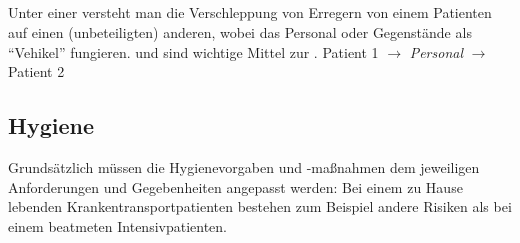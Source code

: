 \subsection{}
\label{topic:kreuzinfektion}

\TextSlide{\TxBeschreibung}
{%
Unter einer  versteht man die
Verschleppung von Erregern von einem Patienten auf einen
(unbeteiligten) anderen, wobei das Personal oder Gegenstände
als \enquote{Vehikel} fungieren. 
und  sind wichtige
Mittel zur .
}{
Patient 1 ${\rightarrow}$ \emph{Personal} ${\rightarrow}$
Patient 2 }{}{}{}

\begin{Synopsis}
\end{Synopsis}

\subsection{ Hygiene}

Grundsätzlich müssen die Hygienevorgaben und -maßnahmen dem
jeweiligen Anforderungen und Gegebenheiten
angepasst werden: Bei einem zu Hause lebenden
Krankentransportpatienten bestehen zum Beispiel andere
Risiken als bei einem beatmeten Intensivpatienten.


